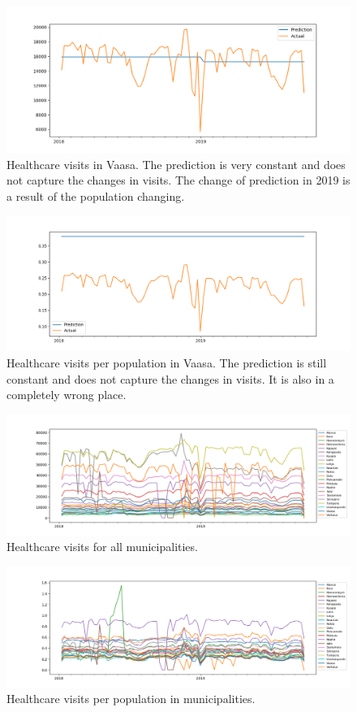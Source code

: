 \documentclass[a4paper, 12pt, english]{article}
\begin{document}
\begin{figure}
\includegraphics[width=\textwidth]{predictions1}
\caption{
Healthcare visits in Vaasa. The prediction is very
constant and does not capture the changes in
visits. The change of prediction in
2019 is a result of the population changing.
}
\label{predictions1}
\end{figure}

\begin{figure}
\includegraphics[width=\textwidth]{predictions2}
\caption{
Healthcare visits per population in Vaasa.
The prediction is still constant and does not
capture the changes in
visits. It is also in a completely wrong place.
}
\label{predictions2}
\end{figure}

\begin{figure}
\includegraphics[width=\textwidth]{visits}
\caption{
Healthcare visits for all municipalities.
}
\label{visits}
\end{figure}

\begin{figure}
\includegraphics[width=\textwidth]{visitsperpop}
\caption{
Healthcare visits per population in municipalities.
}
\label{visitsperpop}
\end{figure}
\end{document}
